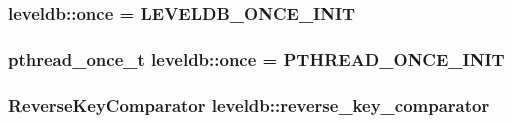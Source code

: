 \hypertarget{namespaceleveldb_aaca89bbfe8c9115ec6faaf59a77ca965}{
\subsubsection[{once}]{ leveldb\-::once = {\bf L\-E\-V\-E\-L\-D\-B\-\_\-\-O\-N\-C\-E\-\_\-\-I\-N\-I\-T}\hspace{0.3cm}{\ttfamily [static]}}}\label{namespaceleveldb_aaca89bbfe8c9115ec6faaf59a77ca965}
\hypertarget{namespaceleveldb_ae0ee2b9a8da60ad51918137eba9ffedb}{
\subsubsection[{once}]{\setlength{\rightskip}{0pt plus 5cm}pthread\-\_\-once\-\_\-t leveldb\-::once = P\-T\-H\-R\-E\-A\-D\-\_\-\-O\-N\-C\-E\-\_\-\-I\-N\-I\-T\hspace{0.3cm}{\ttfamily [static]}}}\label{namespaceleveldb_ae0ee2b9a8da60ad51918137eba9ffedb}
\hypertarget{namespaceleveldb_a4f7cb0b6f4da1c10852632bfdb7dd227}{
\subsubsection[{reverse\-\_\-key\-\_\-comparator}]{\setlength{\rightskip}{0pt plus 5cm}Reverse\-Key\-Comparator leveldb\-::reverse\-\_\-key\-\_\-comparator\hspace{0.3cm}{\ttfamily [static]}}}\label{namespaceleveldb_a4f7cb0b6f4da1c10852632bfdb7dd227}

